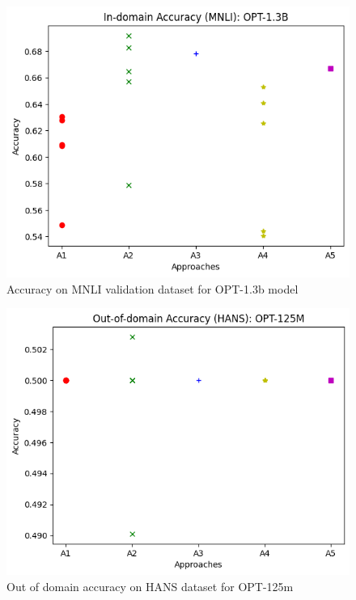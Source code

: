 \documentclass[10pt,twocolumn,letterpaper]{article}
\begin{document}
\begin{figure}[h]
\begin{center}
\includegraphics[width=0.8\linewidth]{figures/opt-1_3b-accuracy.png}
\end{center}
\caption{Accuracy on MNLI validation dataset for OPT-1.3b model}
\end{figure}

\begin{figure}[h]
\begin{center}
\includegraphics[width=0.8\linewidth]{figures/out-of-domain-opt-125m.png}
\end{center}
\caption{Out of domain accuracy on HANS dataset for OPT-125m}
\end{figure}
\end{document}
